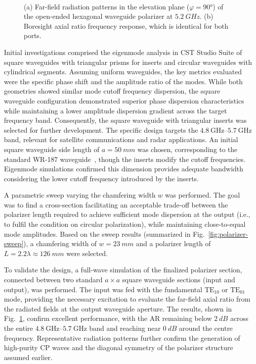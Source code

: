 \documentclass[journal,9pt]{IEEEtran}
\newcommand{\frequencyrange}{\qtyrange{4.8}{5.7}{\giga\hertz}}
\newcommand{\TE}[2]{\text{TE}_{#1#2}}
\begin{document}
\begin{figure}[!b]
    \centering
    \\
    \caption{\label{fig:polarizer-radiation}(a) Far-field radiation patterns in the elevation plane ($\varphi=\ang{90}$) of the open-ended hexagonal waveguide polarizer at $\qty{5.2}{GHz}$. (b) Boresight axial ratio frequency response, which is identical for both ports.}
\end{figure}

Initial investigations comprised the eigenmode analysis in CST Studio Suite of square waveguides with triangular prisms for inserts and circular waveguides with cylindrical segments. Assuming uniform waveguides, the key metrics evaluated were the specific phase shift and the amplitude ratio of the modes. While both geometries showed similar mode cutoff frequency dispersion, the square waveguide configuration demonstrated superior phase dispersion characteristics while maintaining a lower amplitude dispersion gradient across the target frequency band. Consequently, the square waveguide with triangular inserts was selected for further development. The specific design targets the $\frequencyrange$ band, relevant for satellite communications and radar applications. An initial square waveguide side length of $a = \qty{50}{mm}$ was chosen, corresponding to the standard WR-187 waveguide~\cite{spinner:waveguide-specifications}, though the inserts modify the cutoff frequencies. Eigenmode simulations confirmed this dimension provides adequate bandwidth considering the lower cutoff frequency introduced by the inserts.

A parametric sweep varying the chamfering width $w$ was performed. The goal was to find a cross-section facilitating an acceptable trade-off between the polarizer length required to achieve sufficient mode dispersion at the output (i.e., to fulfil the condition on circular polarization), while maintaining close-to-equal mode amplitudes. Based on the sweep results (summarized in Fig.~\ref{fig:polarizer-sweep}), a chamfering width of $w = \qty{23}{mm}$ and a polarizer length of $L = 2.2\lambda \approx \qty{126}{mm}$ were selected.

To validate the design, a full-wave simulation of the finalized polarizer section, connected between two standard $a \times a$ square waveguide sections (input and output), was performed. The input was fed with the fundamental $\TE 10$ or $\TE 01$ mode, providing the necessary excitation to evaluate the far-field axial ratio from the radiated fields at the output waveguide aperture. The results, shown in Fig.~\ref{fig:polarizer-radiation}, confirm excellent performance, with the AR remaining below $\qty{2}{dB}$ across the entire $\frequencyrange$ band and reaching near $\qty{0}{dB}$ around the centre frequency. Representative radiation patterns further confirm the generation of high-purity CP waves and the diagonal symmetry of the polarizer structure assumed earlier.
\end{document}
